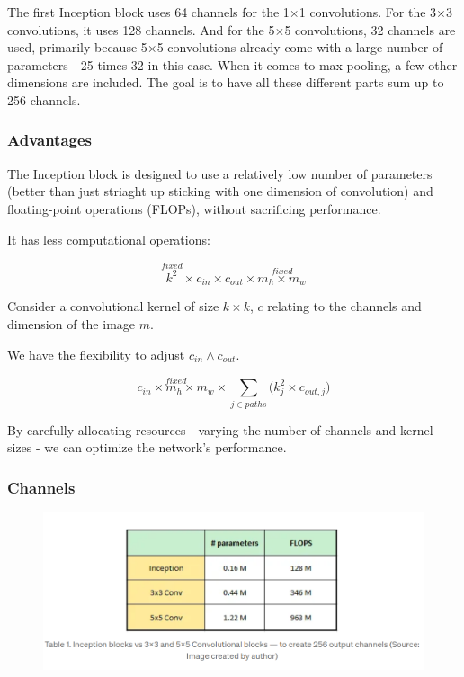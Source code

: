 \documentclass[11pt]{article}
\begin{document}
The first Inception block uses 64 channels for the 1$\times$1 convolutions. For the 3$\times$3 convolutions, it uses 128 channels. And for the 5$\times$5 convolutions, 32 channels are used, primarily because 5$\times$5 convolutions already come with a large number of parameters—25 times 32 in this case. When it comes to max pooling, a few other dimensions are included. The goal is to have all these different parts sum up to 256 channels. 

\subsubsection{Advantages}

The Inception block is designed to use a relatively low number of parameters (better than just striaght up sticking with one dimension of convolution) and floating-point operations (FLOPs), without sacrificing performance.

It has less computational operations:

\begin{equation*}
    \stackrel{fixed}{\boxed{k^2}} \times c_{in} \times c_{out} \times \stackrel{fixed}{\boxed{m_h \times m_w}}
\end{equation*}

Consider a convolutional kernel of size $k\times k$, $c$ relating to the channels and dimension of the image $m$. 

We have the flexibility to adjust $c_{in} \wedge c_{out}$.

\begin{equation*}
    \stackrel{fixed}{\boxed{c_{in} \times m_h \times m_w}} \times \sum_{j \in paths}\bigl(k^2_j \times c_{out,j}\bigr)
\end{equation*}

By carefully allocating resources - varying the number of channels and kernel sizes - we can optimize the network's performance.

\subsubsection{Channels}

\begin{figure}[H]
    \centering
    \includegraphics[width=.8\linewidth]{figures/table1.png}
\end{figure}
\end{document}
